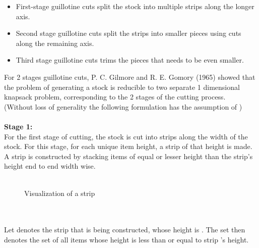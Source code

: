 \documentclass[a4paper]{article}
\begin{document}
    \begin{itemize}
        \item First-stage guillotine cuts split the stock into multiple strips along the longer axis.
        \item Second stage guillotine cuts split the strips into smaller pieces using cuts along the remaining axis.
        \item Third stage guillotine cuts trims the pieces that needs to be even smaller.
    \end{itemize}
    \noindent
    For 2 stages guillotine cuts, P. C. Gilmore and R. E. Gomory (1965)\cite{f6bab824-25b0-39e2-8f1e-13aaf2701321} showed that the problem of generating a stock  is reducible to two separate 1 dimensional knapsack problem, corresponding to the 2 stages of the cutting process.\\
    (Without loss of generality the following formulation has the assumption of )
    \\ \\
    \textbf{Stage 1:}\\
    \noindent
    For the first stage of cutting, the stock  is cut into strips along the width of the stock.
    For this stage, for each unique item height, a strip of that height is made. A strip is constructed by stacking items of equal or lesser height than the strip's height end to end width wise.
    \\ \\
    \begin{figure}[h]
        \centering
        \caption{Visualization of a strip}
    \end{figure}
    \\ \\
    Let  denotes the strip that is being constructed, whose height is . The set  then denotes the set of all items whose height is less than or equal to strip 's height.
\end{document}
